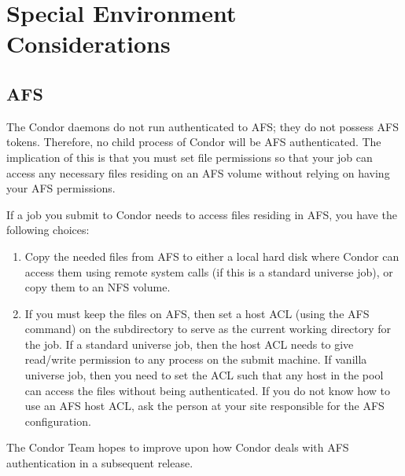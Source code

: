 %




\section{Special Environment Considerations}

\subsection{AFS}

The Condor daemons do not run authenticated to AFS; they do not possess
AFS tokens.
Therefore, no child process of Condor will be AFS authenticated.
The implication of this is that you must set file permissions so
that your job can access any necessary files residing on an AFS volume
without relying on having your AFS permissions.

If a job you submit to Condor needs to access files residing in AFS,
you have the following choices:
\begin{enumerate}
\item Copy the needed files from AFS to either a local hard disk where 
Condor can access them using remote system calls (if
this is a standard universe job), or copy them to an NFS volume.
\item If you must keep the files on AFS, then set a host ACL
(using the AFS  command) on the subdirectory to
serve as the current working directory for the job.
If a standard universe job, then the host ACL needs
to give read/write permission to any process on the submit machine.
If vanilla universe job, then you need to set the ACL such that any host 
in the pool can access the files without being authenticated.
If you do not know how to use an AFS host ACL, ask the person at your 
site responsible for the AFS configuration.
\end{enumerate}

The Condor Team hopes to improve upon how Condor deals with AFS 
authentication in a subsequent release.


